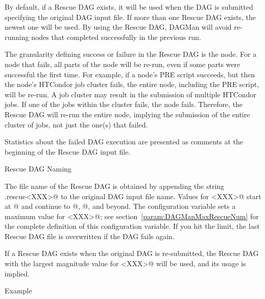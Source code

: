 By default, if a Rescue DAG exists, it will be used when the DAG
is submitted specifying the original DAG input file.  
If more than one Rescue DAG exists, 
the newest one will be used.  
By using the Rescue DAG,
DAGMan will avoid re-running nodes that completed successfully
in the previous run.

The granularity defining success or failure
in the Rescue DAG is the node.
For a node that fails,
all parts of the node will be re-run,
even if some parts were successful the first time.
For example, if a node's PRE script
succeeds, but then the node's HTCondor job cluster fails,
the entire node, including the PRE script, will be re-run.
A job cluster may result in the submission of multiple HTCondor jobs.
If one of the jobs within the cluster fails, the node fails.
Therefore, the Rescue DAG will re-run the entire node,
implying the submission of the entire cluster of jobs,
not just the one(s) that failed.

Statistics about the failed DAG execution are presented as
comments at the beginning of the Rescue DAG input file.

\label{dagman:rescue_dag_naming}
\begin{description}
\item[Rescue DAG Naming]
\end{description}

The file name of the Rescue DAG is obtained by
appending the string
\verb@.rescue<XXX>@ to the original DAG input file name.
Values for \verb@<XXX>@ start at @ and continue
to @, @, and beyond.
The configuration variable 
sets a maximum value for \verb@<XXX>@;
see section~\ref{param:DAGManMaxRescueNum} for the complete definition
of this configuration variable.  If you hit the
 limit, the last Rescue DAG file
is overwritten if the DAG fails again.

If a Rescue DAG exists when the original DAG is re-submitted,
the Rescue DAG with the largest magnitude value for \verb@<XXX>@
will be used, and its usage is implied.

\label{dagman:rescue_dag_example}
\begin{description}
\item[Example]
\end{description}

